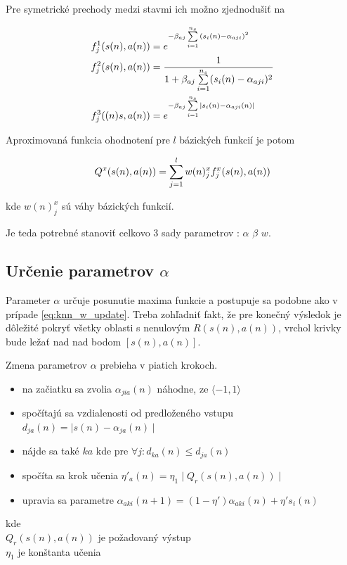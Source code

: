 Pre symetrické prechody medzi stavmi ich možno zjednodušiť na

\begin{align}
f_j^1(\boldmath{s(n), a(n)}) &= e^{ -\beta_{aj} \sum\limits_{i=1}^{n_s}{(s_i(n) - \alpha_{aji})^2} }  \\
f_j^2(\boldmath{s(n), a(n)}) &= \frac{1}{1 + {\beta_{aj} \sum\limits_{i=1}^{n_s}(s_i(n) - \alpha_{aji})^2}}  \\
f_j^3(\boldmath{(n)s, a(n)}) &= e^{ -\beta_{aj} \sum\limits_{i=1}^{n_s}{\mid s_i(n) - \alpha_{aji}(n) \mid} }
\label{eq:basis_functions}
\end{align}

Aproximovaná funkcia ohodnotení pre $l$ bázických funkcií je potom

\begin{align}
Q^x(s(n), a(n)) = \sum\limits_{j=1}^{l} w(n)_j^x f_j^x(\boldmath{s(n), a(n)})
\label{eq:knn_y_update}
\end{align}

kde $w(n)_j^x$ sú váhy bázických funkcií.


Je teda potrebné stanoviť celkovo 3 sady parametrov : $\alpha$ $\beta$ $w$.

\subsection{Určenie parametrov $\alpha$}

Parameter $\alpha$ určuje posunutie maxima funkcie a postupuje sa podobne
ako v prípade \ref{eq:knn_w_update}. Treba zohľadniť fakt, že pre konečný
výsledok je dôležité pokryť všetky oblasti s nenulovým $R(s(n),a(n))$, vrchol
krivky bude ležať nad nad bodom $[s(n),a(n)]$.

Zmena parametrov $\alpha$ prebieha v piatich krokoch.

\begin{itemize}
  \item na začiatku sa zvolia $\alpha_{jia}(n)$ náhodne, ze $\langle -1, 1 \rangle$
  \item spočítajú sa vzdialenosti od predloženého vstupu $d_{ja}(n) = \mid s(n) - \alpha_{ja}(n) \mid$
  \item nájde sa také $ka$ kde pre $\forall{j} : d_{ka}(n) \leq d_{ja}(n)$
  \item spočíta sa krok učenia $\eta'_a(n) = \eta_1 \mid Q_r(s(n), a(n)) \mid$
  \item upravia sa parametre $\alpha_{aki}(n+1) = (1 - \eta')\alpha_{aki}(n) + \eta' s_{i}(n)$
\end{itemize}
kde \\
$Q_r(s(n), a(n))$ je požadovaný výstup \\
$\eta_1$ je konštanta učenia

